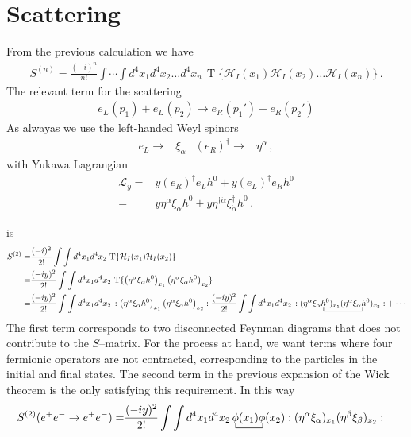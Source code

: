 \section{Scattering}
\label{sec:scattering}
From the previous calculation we have
\begin{align}
S^{(n)}=  \frac{(-i)^n}{n!}\int\cdots\int d^4x_1 d^4x_2\ldots d^4x_n\,\operatorname{T}\{\mathcal{H}_I(x_1)\mathcal{H}_I(x_2)\ldots\mathcal{H}_I(x_n)\}\,.
\end{align}
The relevant term for the scattering
\begin{align}
  e^{-}_L(p_1)+e_L^{-}(p_2)\to   e_R^{-}(p_1')+e_R^{-}(p_2')
\end{align}
As alwayas we use the left-handed Weyl spinors
\begin{align}
  e_L\to &\xi_{\alpha} &   \left( e_R \right)^{\dagger}\to &\eta^{\alpha}\,,
\end{align}
with Yukawa Lagrangian
\begin{align}
  \mathcal{L}_y=& y \left(e_R\right)^{\dagger} e_L h^0 +y \left(e_L\right)^{\dagger} e_R h^0 \nonumber\\
               =& y \eta^{\alpha} \xi_{\alpha}h^0 + y \eta^{\dagger\dot{\alpha}} \xi_{\dot{\alpha}}^{\dagger}h^0\,. 
\end{align}


is
\begin{align}
S^{(2)}=&  \frac{(-i)^2}{2!}\int\int d^4x_1 d^4x_2\,\operatorname{T}\{\mathcal{H}_I(x_1)\mathcal{H}_I(x_2)\}\nonumber\\
=&  \frac{(-iy)^2}{2!}\int\int d^4x_1 d^4x_2\,\operatorname{T}\{\left( \eta^{\alpha} \xi_{\alpha}h^0 \right)_{x_1} \left( \eta^{\alpha} \xi_{\alpha}h^0 \right)_{x_2}\}\nonumber\\
=& 
 \frac{(-iy)^2}{2!}\int\int d^4x_1 d^4x_2\,:\left( \eta^{\alpha} \xi_{\alpha}h^0 \right)_{x_1} \left( \eta^{\alpha} \xi_{\alpha}h^0 \right)_{x_2}:
 \frac{(-iy)^2}{2!}\int\int d^4x_1 d^4x_2\,:( \eta^{\alpha} 
\bcontraction{\xi_{\alpha}}{\phi}{)_{x_1}(\eta^{\alpha} \xi_{\alpha}}{h^0}
\xi_{\alpha} h^0)_{x_1}(\eta^{\alpha} \xi_{\alpha}h^0 
)_{x_2}:+\cdots
\end{align}
The first term corresponds to two  disconnected Feynman diagrams that does not contribute to the $S$--matrix. For the process at hand, we want terms where four fermionic operators are not contracted, corresponding to the particles in the initial and final states. The second term in the previous expansion of the Wick theorem is the only satisfying this requirement. In this way
\begin{align}
  S^{(2)}(e^+ e^-\to e^+e^-)=&\frac{(-iy)^2}{2!}\int\int d^4x_1 d^4x_2
\bcontraction{\,}{\phi}{(x_1)}{\phi}
\,\phi(x_1)\phi(x_2):(\eta^{\alpha} \xi_{\alpha})_{x_1}(\eta^{\beta} \xi_{\beta})_{x_2}:
\end{align}

